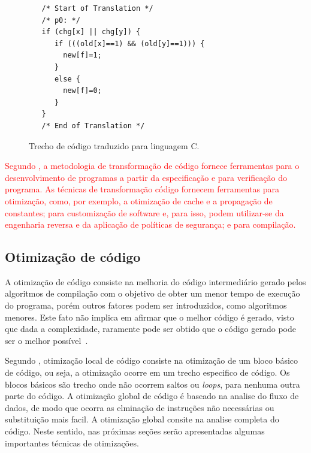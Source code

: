 \begin{figure}[thp]
\caption{\label{fig:cod_c} Trecho de código traduzido para linguagem C.}
	\begin{center}
    \begin{minipage}{0.9\textwidth}
    \begin{lstlisting}       
   /* Start of Translation */
   /* p0: */
   if (chg[x] || chg[y]) {
      if (((old[x]==1) && (old[y]==1))) {
      	new[f]=1;
      }
      else {
      	new[f]=0;
      }
   }
   /* End of Translation */

	\end{lstlisting}
    \end{minipage}
	\end{center}
\end{figure}

\par
\textcolor{red}{Segundo , a metodologia de transformação de código fornece ferramentas para o desenvolvimento de programas a partir da especificação e para verificação do programa. As técnicas de transformação código fornecem ferramentas para otimização, como, por exemplo, a otimização de cache\cite{jin2001theoretical} e a propagação de constantes\cite{kildall1973unified}; para customização de software e, para isso, podem utilizar-se da engenharia reversa\cite{yang1997reverse} e da aplicação de políticas de segurança\cite{erlingsson2000sasi}; e para compilação.}

\subsection{Otimização de código}
\par
A otimização de código consiste na melhoria do código intermediário gerado pelos algoritmos de compilação com o objetivo de obter um menor tempo de execução do programa, porém outros fatores podem ser introduzidos, como algoritmos menores. Este fato não implica em afirmar que o melhor código é gerado, visto que dada a complexidade, raramente pode ser obtido que o código gerado pode ser o melhor possível~\cite{aho2007compilers}.

\par
Segundo \citeauthor{aho2007compilers}, otimização local de código consiste na otimização de um bloco básico de código, ou seja, a otimização ocorre em um trecho especifico de código. Os blocos básicos são trecho onde não ocorrem saltos ou \textit{loops}, para nenhuma outra parte do código. A otimização global de código é baseado na analise do fluxo de dados, de modo que ocorra as elminação de instruções não necessárias ou substituição mais facil. A otimização global consite na analise completa do código. Neste sentido, nas próximas seções serão apresentadas algumas importantes técnicas de otimizações.

